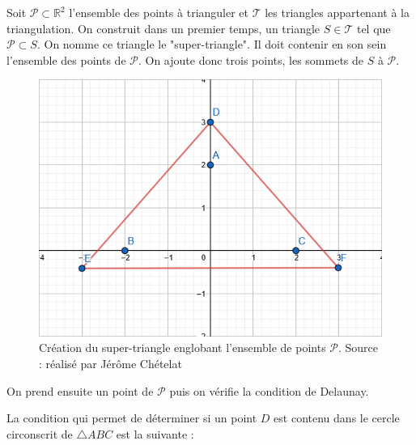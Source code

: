 Soit $\mathcal{P} \subset \mathbb{R}^2$ l'ensemble des points à trianguler et $\mathcal{T}$ les triangles appartenant à la triangulation.
On construit dans un premier temps, un triangle $S \in \mathcal{T}$ tel que $\mathcal{P} \subset S$.
On nomme ce triangle le "super-triangle".
Il doit contenir en son sein l'ensemble des points de $\mathcal{P}$.
On ajoute donc trois points, les sommets de $S$ à $\mathcal{P}$.

\begin{figure}[htbp!]
    \centering
    \includegraphics[width=0.66\linewidth]{figures/bowyer-watson/step_3.png}
	\caption{Création du super-triangle englobant l'ensemble de points $\mathcal{P}$. Source : réalisé par
	Jérôme Chételat}
	\label{fig:triangulation_step_3}
\end{figure}

On prend ensuite un point de $\mathcal{P}$ puis on vérifie la condition de
Delaunay.

La condition qui permet de déterminer si un point $D$ est contenu dans le cercle circonscrit de $\triangle ABC$ est la suivante :

